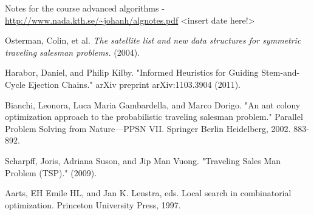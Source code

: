 \documentclass[paper=a4, fontsize=11pt,numbers=endperiod]{scrartcl} %
\numberwithin{equation}{section} %
\numberwithin{figure}{section} %
\numberwithin{table}{section} %
\begin{document}
\newpage
\begin{thebibliography}{9}

 Notes for the course advanced algorithms - \url{http://www.nada.kth.se/~johanh/algnotes.pdf} <insert date here!>
 
 Osterman, Colin, et al. \emph{The satellite list and new data structures for symmetric traveling salesman problems.} (2004).

 Harabor, Daniel, and Philip Kilby. "Informed Heuristics for Guiding Stem-and-Cycle Ejection Chains." arXiv preprint arXiv:1103.3904 (2011).

 Bianchi, Leonora, Luca Maria Gambardella, and Marco Dorigo. "An ant colony optimization approach to the probabilistic traveling salesman problem." Parallel Problem Solving from Nature—PPSN VII. Springer Berlin Heidelberg, 2002. 883-892.

 Scharpff, Joris, Adriana Suson, and Jip Man Vuong. "Traveling Sales Man Problem (TSP)." (2009).

 Aarts, EH Emile HL, and Jan K. Lenstra, eds. Local search in combinatorial optimization. Princeton University Press, 1997.

\end{thebibliography}
\end{document}
